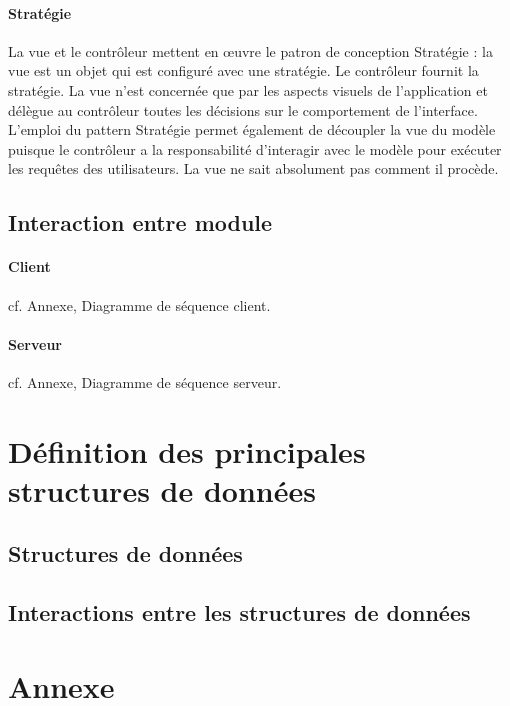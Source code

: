 \documentclass[10pt,a4paper]{report}
\begin{document}
		\paragraph{Stratégie}
		\begin{flushleft}
		La vue et le contrôleur mettent en œuvre le patron de conception Stratégie : la vue est un objet qui est configuré avec une stratégie. Le contrôleur fournit la stratégie. La vue n’est concernée que par les aspects visuels de l’application et délègue au contrôleur toutes les décisions sur le  comportement de l’interface. L’emploi du pattern Stratégie permet également de découpler la vue du modèle puisque le contrôleur a la responsabilité d’interagir avec le modèle pour exécuter les requêtes des utilisateurs. La vue ne sait absolument pas comment il procède.		
		\end{flushleft}


\subsection{Interaction entre module}
\paragraph{Client}
cf. Annexe, Diagramme de séquence client.
\paragraph{Serveur}
cf. Annexe, Diagramme de séquence serveur.
\section{Définition des principales structures de données}

	\subsection{Structures de données}

	\subsection{Interactions entre les structures de données} %

\newpage
\section{Annexe}
\end{document}
